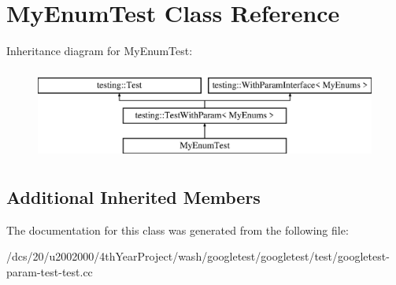 \hypertarget{classMyEnumTest}{}\section{My\+Enum\+Test Class Reference}
\label{classMyEnumTest}
Inheritance diagram for My\+Enum\+Test\+:\begin{figure}[H]
\begin{center}
\leavevmode
\includegraphics[height=3.000000cm]{classMyEnumTest}
\end{center}
\end{figure}
\subsection*{Additional Inherited Members}


The documentation for this class was generated from the following file\+:\begin{DoxyCompactItemize}
\item 
/dcs/20/u2002000/4th\+Year\+Project/wash/googletest/googletest/test/googletest-\/param-\/test-\/test.\+cc\end{DoxyCompactItemize}
